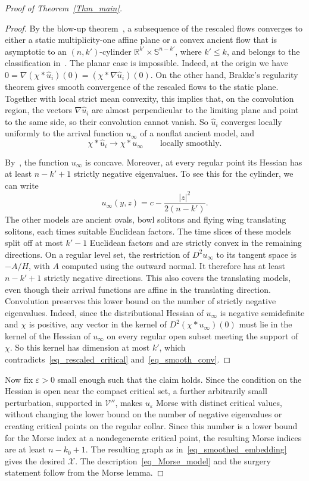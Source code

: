 \documentclass[10pt,a4paper]{amsart}
\newcommand{\IR}{\mathbb{R}}
\newcommand{\IS}{\mathbb{S}}
\newcommand{\VV}{\mathcal{V}}
\newcommand{\XX}{\mathcal{X}}
\newcommand{\eps}{\varepsilon}
\numberwithin{equation}{section}
\begin{document}
\begin{proof}[Proof of Theorem~\ref{Thm_main}]
\begin{proof}
By the blow-up theorem~\cite[Theorem~1.12]{BamlerLai}, a subsequence of the rescaled flows converges to either a static multiplicity-one affine plane or a convex ancient flow that is asymptotic to an $(n,k')$-cylinder $\IR^{k'}\times\IS^{n-k'}$, where $k'\leq k$, and belongs to the classification in~\cite[Theorem~1.2]{BamlerLai}.
The planar case is impossible.
Indeed, at the origin we have $0=\nabla(\chi*\hat u_i)(0)=(\chi*\nabla\hat u_i)(0)$.
On the other hand, Brakke's regularity theorem gives smooth convergence of the rescaled flows to the static plane.
Together with local strict mean convexity, this implies that, on the convolution region, the vectors $\nabla\hat u_i$ are almost perpendicular to the limiting plane and point to the same side, so their convolution cannot vanish.
So $\hat u_i$ converges locally uniformly to the arrival function $u_\infty$ of a nonflat ancient model, and
\[
 \chi*\hat u_i\longrightarrow\chi*u_\infty
 \qquad\text{locally smoothly}.
\tag{3.5}\label{eq_smooth_conv}
\]

By~\cite[Proposition~3.2]{BourniLangfordLynch}, the function $u_\infty$ is concave.
Moreover, at every regular point its Hessian has at least $n-k'+1$ strictly negative eigenvalues.
To see this for the cylinder, we can write
\[
 u_\infty(y,z)=c-\frac{|z|^2}{2(n-k')}.
\]
The other models are ancient ovals, bowl solitons and flying wing translating solitons, each times suitable Euclidean factors.
The time slices of these models split off at most $k'-1$ Euclidean factors and are strictly convex in the remaining directions.
On a regular level set, the restriction of $D^2u_\infty$ to its tangent space is $-A/H$, with $A$ computed using the outward normal.
It therefore has at least $n-k'+1$ strictly negative directions.
This also covers the translating models, even though their arrival functions are affine in the translating direction.
Convolution preserves this lower bound on the number of strictly negative eigenvalues.
Indeed, since the distributional Hessian of $u_\infty$ is negative semidefinite and $\chi$ is positive, any vector in the kernel of $D^2(\chi*u_\infty)(0)$ must lie in the kernel of the Hessian of $u_\infty$ on every regular open subset meeting the support of $\chi$.
So this kernel has dimension at most $k'$, which contradicts~\eqref{eq_rescaled_critical} and~\eqref{eq_smooth_conv}.
\end{proof}

Now fix $\eps>0$ small enough such that the claim holds.
Since the condition on the Hessian is open near the compact critical set, a further arbitrarily small perturbation, supported in $\VV''$, makes $u_\eps$ Morse with distinct critical values, without changing the lower bound on the number of negative eigenvalues or creating critical points on the regular collar.
Since this number is a lower bound for the Morse index at a nondegenerate critical point, the resulting Morse indices are at least $n-k_0+1$.
The resulting graph as in~\eqref{eq_smoothed_embedding} gives the desired $\XX$.
The description~\eqref{eq_Morse_model} and the surgery statement follow from the Morse lemma.
\end{proof}
\end{document}
